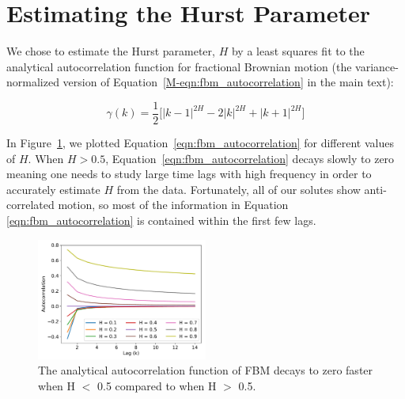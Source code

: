 \documentclass{article}
\begin{document}

  
  \newpage
  \section{Estimating the Hurst Parameter}\label{section:H_estimate}
  
  We chose to estimate the Hurst parameter, $H$ by a least squares fit to the analytical
  autocorrelation function for fractional Brownian motion (the variance-normalized version 
  of Equation~\ref{M-eqn:fbm_autocorrelation} in the main text):
  
  \begin{equation}
    \gamma(k) = \dfrac{1}{2}\bigg[|k-1|^{2H} - 2|k|^{2H} + |k+1|^{2H}\bigg]
  \label{eqn:fbm_autocorrelation}
  \end{equation}  
  
  In Figure~\ref{fig:hurst_autocorrelation}, we plotted Equation~\ref{eqn:fbm_autocorrelation}
  for different values of $H$. When $H > 0.5$, Equation~\ref{eqn:fbm_autocorrelation} decays
  slowly to zero meaning one needs to study large time lags with high frequency in order to
  accurately estimate $H$ from the data. Fortunately, all of our solutes show anti-correlated
  motion, so most of the information in Equation \ref{eqn:fbm_autocorrelation} is contained
  within the first few lags. 

  \begin{figure}
  \centering
  \includegraphics[width=0.5\textwidth]{hurst_autocorrelation.pdf}
  \caption{The analytical autocorrelation function of FBM decays to zero faster when 
  H $<$ 0.5 compared to when H $>$ 0.5.}\label{fig:hurst_autocorrelation}
  \end{figure}
  
\end{document}
